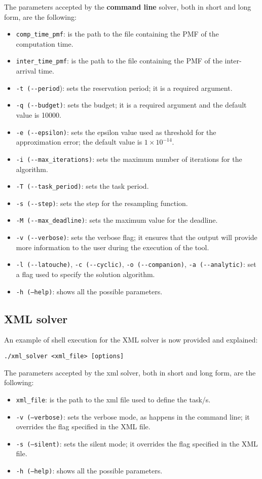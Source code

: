 The parameters accepted by the \textbf{command line} solver, both in short and long form, are the following:
\begin{itemize}
  \item \texttt{comp\_time\_pmf}: is the path to the file containing the PMF of the computation time.
  \item \texttt{inter\_time\_pmf}: is the path to the file containing the PMF of the inter-arrival time.
  \item \texttt{-t (-{}-period}): sets the reservation period; it is a required argument.
  \item \texttt{-q (-{}-budget)}: sets the budget; it is a required argument and the default value is 10000.
  \item \texttt{-e (-{}-epsilon)}: sets the epsilon value used as threshold for the approximation error; the default value is \( 1 \times 10^{-14} \).
  \item \texttt{-i (-{}-max\_iterations)}: sets the maximum number of iterations for the algorithm.
  \item \texttt{-T (-{}-task\_period)}: sets the task period.
  \item \texttt{-s (-{}-step)}: sets the step for the resampling function.
  \item \texttt{-M (-{}-max\_deadline)}: sets the maximum value for the deadline.
  \item \texttt{-v (-{}-verbose)}: sets the verbose flag; it ensures that the output will provide more information to the user during the execution of the tool.
  \item \texttt{-l (-{}-latouche)}, \texttt{-c (-{}-cyclic)}, \texttt{-o (-{}-companion)}, \texttt{-a (-{}-analytic)}: set a flag used to specify the solution algorithm. 
  \item \texttt{-h (--help)}: shows all the possible parameters.
\end{itemize}
 
\subsection{XML solver}
An example of shell execution for the XML solver is now provided and explained:
\begin{lstlisting}[frame=bt, numbers=none]
  ./xml_solver <xml_file> [options]
\end{lstlisting}

The parameters accepted by the xml solver, both in short and long form, are the following:
\begin{itemize}
  \item \texttt{xml\_file}: is the path to the xml file used to define the task/s.
  \item \texttt{-v (--verbose)}: sets the verbose mode, as happens in the command line; it overrides the flag specified in the XML file.
  \item \texttt{-s (--silent)}: sets the silent mode; it overrides the flag specified in the XML file.
  \item \texttt{-h (--help)}: shows all the possible parameters.
\end{itemize}

